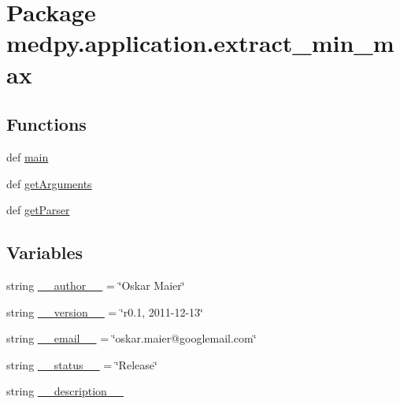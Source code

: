 \hypertarget{namespacemedpy_1_1application_1_1extract__min__max}{
\section{Package medpy.application.extract\_\-min\_\-max}
\label{namespacemedpy_1_1application_1_1extract__min__max}
}
\subsection*{Functions}
\begin{DoxyCompactItemize}
\item 
def \hyperlink{namespacemedpy_1_1application_1_1extract__min__max_a79a367759ba4c3c4b33dc4396506fe2e}{main}
\item 
def \hyperlink{namespacemedpy_1_1application_1_1extract__min__max_a4981b69a148dcf643df179c04a27a523}{getArguments}
\item 
def \hyperlink{namespacemedpy_1_1application_1_1extract__min__max_a61e5b6a3cd981f972c58c2dd70d4660a}{getParser}
\end{DoxyCompactItemize}
\subsection*{Variables}
\begin{DoxyCompactItemize}
\item 
string \hyperlink{namespacemedpy_1_1application_1_1extract__min__max_a960faed32a5a52c1107b15395cf250cd}{\_\-\_\-author\_\-\_\-} = \char`\"{}Oskar Maier\char`\"{}
\item 
string \hyperlink{namespacemedpy_1_1application_1_1extract__min__max_aad1839ca4455eae95fe7005102947390}{\_\-\_\-version\_\-\_\-} = \char`\"{}r0.1, 2011-\/12-\/13\char`\"{}
\item 
string \hyperlink{namespacemedpy_1_1application_1_1extract__min__max_a66f81613de11ea8bb8caa16ef678fdd5}{\_\-\_\-email\_\-\_\-} = \char`\"{}oskar.maier@googlemail.com\char`\"{}
\item 
string \hyperlink{namespacemedpy_1_1application_1_1extract__min__max_a2c1c69b200edd40a8a5613c0668b327b}{\_\-\_\-status\_\-\_\-} = \char`\"{}Release\char`\"{}
\item 
string \hyperlink{namespacemedpy_1_1application_1_1extract__min__max_a4fb60fcb8e1e5167d1cbae84588e449e}{\_\-\_\-description\_\-\_\-}
\end{DoxyCompactItemize}


